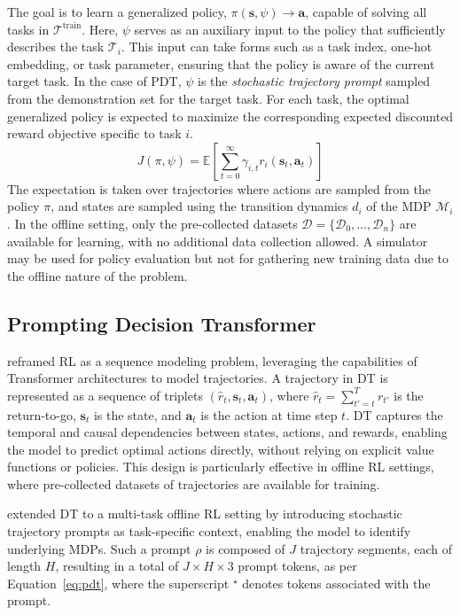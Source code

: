 \documentclass{article} %
\begin{document}
The goal is to learn a generalized policy, $\pi(\mathbf{s}, \psi) \to \mathbf{a}$, capable of solving all tasks in $\mathcal{T}^\text{train}$. 
Here, $\psi$ serves as an auxiliary input to the policy that sufficiently describes the task $\mathcal{T}_i$. This input can take forms such as a task index, one-hot embedding, or task parameter, ensuring that the policy is aware of the current target task. 
In the case of PDT, $\psi$ is the \textit{stochastic trajectory prompt} sampled from the demonstration set for the target task.
For each task, the optimal generalized policy is expected to maximize the corresponding expected discounted reward objective specific to task $i$.
\begin{equation}\label{eq:generalized-objective}
    J(\pi, \psi) = \mathbb{E} \left[ \sum_{t=0}^\infty \gamma_{i, t} r_i(\mathbf{s}_t, \mathbf{a}_t) \right]
\end{equation}
The expectation is taken over trajectories where actions are sampled from the policy $\pi$, and states are sampled using the transition dynamics $d_i$ of the MDP $\mathcal{M}_i$. 
In the offline setting, only the pre-collected datasets $\mathcal{D} = \{\mathcal{D}_0, \dots, \mathcal{D}_n\}$ are available for learning, with no additional data collection allowed. 
A simulator may be used for policy evaluation but not for gathering new training data due to the offline nature of the problem.

\subsection{Prompting Decision Transformer}
\citet{chen2021decision} reframed RL as a sequence modeling problem, leveraging the capabilities of Transformer architectures to model trajectories. A trajectory in DT is represented as a sequence of triplets $(\hat{r}_t, \mathbf{s}_t, \mathbf{a}_t)$, where $\hat{r}_t = \sum_{t' = t} ^T r_{t'}$ is the return-to-go, $\mathbf{s}_t$ is the state, and $\mathbf{a}_t$ is the action at time step $t$. DT captures the temporal and causal dependencies between states, actions, and rewards, enabling the model to predict optimal actions directly, without relying on explicit value functions or policies. This design is particularly effective in offline RL settings, where pre-collected datasets of trajectories are available for training.

\citet{xu2022prompting} extended DT to a multi-task offline RL setting by introducing stochastic trajectory prompts as task-specific context, enabling the model to identify underlying MDPs.  
Such a prompt $\rho$ is composed of $J$ trajectory segments, each of length $H$, resulting in a total of $J \times H \times 3$ prompt tokens, as per Equation~\ref{eq:pdt}, where the superscript $^\star$ denotes tokens associated with the prompt.
\end{document}
